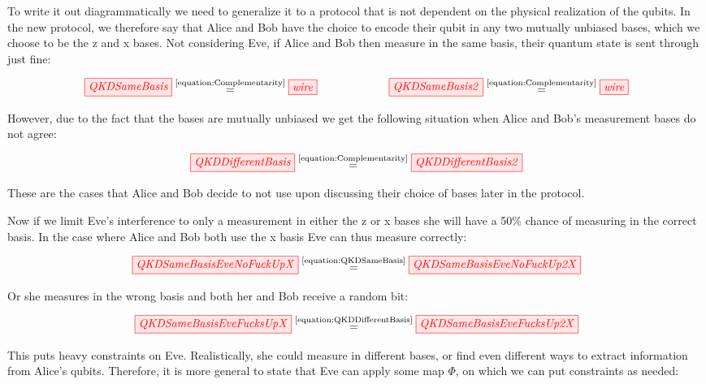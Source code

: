 \documentclass[]{article}
\newcommand{\equaltext}[1]{\ensuremath{\stackrel{\text{#1}}{=}}}
\begin{document}
 To write it out diagrammatically we need to generalize it to a protocol that is not dependent on the physical realization of the qubits. In the new protocol, we therefore say that Alice and Bob have the choice to encode their qubit in any two mutually unbiased bases, which we choose to be the z and x bases. Not considering Eve, if Alice and Bob then measure in the same basis, their quantum state is sent through just fine:

\begin{equation}
	\label{equation:QKDSameBasis}
	\tikzfig{QKDSameBasis} \equaltext{\ref{equation:Complementarity}} \tikzfig{wire} ~~~~~~~~~~~~~~~~~~~ \tikzfig{QKDSameBasis2} \equaltext{\ref{equation:Complementarity}} \tikzfig{wire}
\end{equation}

However, due to the fact that the bases are mutually unbiased we get the following situation when Alice and Bob's measurement bases do not agree:

\begin{equation}
\label{equation:QKDDifferentBasis}
\tikzfig{QKDDifferentBasis} \equaltext{\ref{equation:Complementarity}} \tikzfig{QKDDifferentBasis2}
\end{equation}

These are the cases that Alice and Bob decide to not use upon discussing their choice of bases later in the protocol.

Now if we limit Eve's interference to only a measurement in either the z or x bases she will have a 50\% chance of measuring in the correct basis. In the case where Alice and Bob both use the x basis Eve can thus measure correctly:

\begin{equation}
	\tikzfig{QKDSameBasisEveNoFuckUpX} \equaltext{\ref{equation:QKDSameBasis}} \tikzfig{QKDSameBasisEveNoFuckUp2X} 
\end{equation}

Or she measures in the wrong basis and both her and Bob receive a random bit:

\begin{equation}
	\tikzfig{QKDSameBasisEveFucksUpX} \equaltext{\ref{equation:QKDDifferentBasis}} \tikzfig{QKDSameBasisEveFucksUp2X}
\end{equation}

This puts heavy constraints on Eve. Realistically, she could measure in different bases, or find even different ways to extract information from Alice's qubits. Therefore, it is more general to state that Eve can apply some map $\Phi$, on which we can put constraints as needed:
\end{document}

